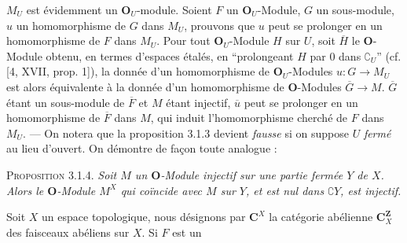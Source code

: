 $M_U$ est évidemment un $\mathbf O_U$-module. Soient $F$ un
$\mathbf O_U$-Module, $G$ un sous-module, $u$ un homomorphisme de $G$ dans
$M_U$, prouvons que $u$ peut se prolonger en un homomorphisme de $F$ dans
$M_U$. Pour tout $\mathbf O_U$-Module $H$ sur $U$, soit $\overline H$ le
$\mathbf O$-Module obtenu, en termes d'espaces étalés, en ``prolongeant $H$
par 0 dans $\complement_U$'' (cf. [4, XVII, prop. 1]), la donnée d'un homomorphisme de
$\mathbf O_U$-Modules $u:G\to M_U$ est alors équivalente à la
donnée d'un homomorphisme de $\mathbf O$-Modules
$\overline G\to M$. $\overline G$ étant un
sous-module de $\overline F$ et $M$ étant injectif, $\overline u$ peut se
prolonger en un homomorphisme de $\overline F$ dans $M$, qui induit
l'homomorphisme cherché de $F$ dans $M_U$. --- On notera que la proposition
3.1.3 devient \textit{fausse} si on suppose $U$ \textit{fermé} au lieu
d'ouvert. On démontre de façon toute analogue :

\indent\textsc{Proposition 3.1.4.} \textit{Soit $M$ un $\mathbf O$-Module
injectif sur une partie fermée $Y$ de $X$. Alors le $\mathbf O$-Module $M^X$
qui coïncide avec $M$ sur $Y$, et est nul dans $\complement Y$, est injectif.}

 Soit $X$ un espace topologique,
nous désignons par $\mathbf C^X$ la catégorie abélienne $\mathbf C^{\mathbf Z}_X$ des
faisceaux abéliens sur $X$. Si $F$ est un

